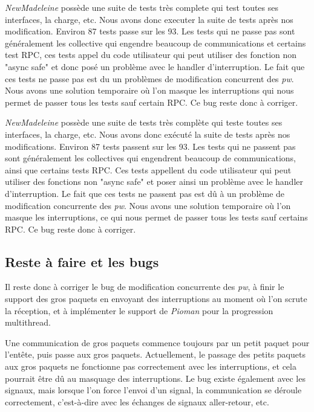 \emph{NewMadeleine} possède une suite de tests très complete qui test toutes ses interfaces, la charge, etc.
Nous avons donc executer la suite de tests après nos modification. Environ 87 tests passe sur les 93.
Les tests qui ne passe pas sont généralement les collective qui engendre beaucoup de communications et certains test RPC,
ces tests appel du code utilisateur qui peut utiliser des fonction non "async safe" et donc posé un problème avec le handler d'interruption.
Le fait que ces tests ne passe pas est du un problèmes de modification concurrent des \emph{pw}.
Nous avons une solution temporaire où l'on masque les interruptions qui nous permet de passer tous les tests sauf certain RPC.
Ce bug reste donc à corriger.

\emph{NewMadeleine} possède une suite de tests très complète qui teste toutes ses interfaces, la charge, etc.
Nous avons donc exécuté la suite de tests après nos modifications. Environ 87 tests passent sur les 93.
Les tests qui ne passent pas sont généralement les collectives qui engendrent beaucoup de communications, ainsi que certains tests RPC.
Ces tests appellent du code utilisateur qui peut utiliser des fonctions non "async safe" et poser ainsi un problème avec le handler d'interruption.
Le fait que ces tests ne passent pas est dû à un problème de modification concurrente des \emph{pw}.
Nous avons une solution temporaire où l'on masque les interruptions, ce qui nous permet de passer tous les tests sauf certains RPC.
Ce bug reste donc à corriger.

\subsection{Reste à faire et les bugs}

Il reste donc à corriger le bug de modification concurrente des \emph{pw},
à finir le support des gros paquets en envoyant des interruptions au moment où l'on scrute la réception,
et à implémenter le support de \emph{Pioman} pour la progression multithread.

Une communication de gros paquets commence toujours par un petit paquet pour l'entête, puis passe aux gros paquets.
Actuellement, le passage des petits paquets aux gros paquets ne fonctionne pas correctement avec les interruptions,
et cela pourrait être dû au masquage des interruptions.
Le bug existe également avec les signaux, mais lorsque l'on force l'envoi d'un signal,
la communication se déroule correctement, c'est-à-dire avec les échanges de signaux aller-retour, etc.

